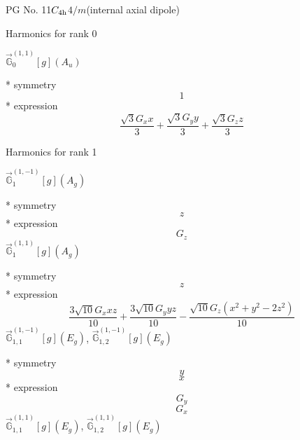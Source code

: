 \documentclass[fleqn,8pt]{jsarticle}
\begin{document}
\setcounter{MaxMatrixCols}{32}

\renewcommand{\tablename}{Table~}
\renewcommand{\figurename}{Figure~}
\begin{center}
\LARGE
PG No. 11\quad$C_{\rm 4h}$\quad$4/m$\quad[ tetragonal ] (internal axial dipole)
\end{center}

\noindent * Harmonics for rank 0

\noindent\quad $\vec{\mathbb{G}}_{0}^{(1,1)}[g](A_{u})$

\noindent\quad ** symmetry
\begin{dmath*}
1
\end{dmath*}
\noindent\quad ** expression
\begin{dmath*}
\frac{\sqrt{3} G_{x} x}{3} + \frac{\sqrt{3} G_{y} y}{3} + \frac{\sqrt{3} G_{z} z}{3}
\end{dmath*}

\noindent * Harmonics for rank 1

\noindent\quad $\vec{\mathbb{G}}_{1}^{(1,-1)}[g](A_{g})$

\noindent\quad ** symmetry
\begin{dmath*}
z
\end{dmath*}
\noindent\quad ** expression
\begin{dmath*}
G_{z}
\end{dmath*}
\noindent\quad $\vec{\mathbb{G}}_{1}^{(1,1)}[g](A_{g})$

\noindent\quad ** symmetry
\begin{dmath*}
z
\end{dmath*}
\noindent\quad ** expression
\begin{dmath*}
\frac{3 \sqrt{10} G_{x} x z}{10} + \frac{3 \sqrt{10} G_{y} y z}{10} - \frac{\sqrt{10} G_{z} \left(x^{2} + y^{2} - 2 z^{2}\right)}{10}
\end{dmath*}
\noindent\quad $\vec{\mathbb{G}}_{1,1}^{(1,-1)}[g](E_{g})$, $\vec{\mathbb{G}}_{1,2}^{(1,-1)}[g](E_{g})$

\noindent\quad ** symmetry
\begin{dmath*}
y
\end{dmath*}
\begin{dmath*}
x
\end{dmath*}
\noindent\quad ** expression
\begin{dmath*}
G_{y}
\end{dmath*}
\begin{dmath*}
G_{x}
\end{dmath*}
\noindent\quad $\vec{\mathbb{G}}_{1,1}^{(1,1)}[g](E_{g})$, $\vec{\mathbb{G}}_{1,2}^{(1,1)}[g](E_{g})$
\end{document}
